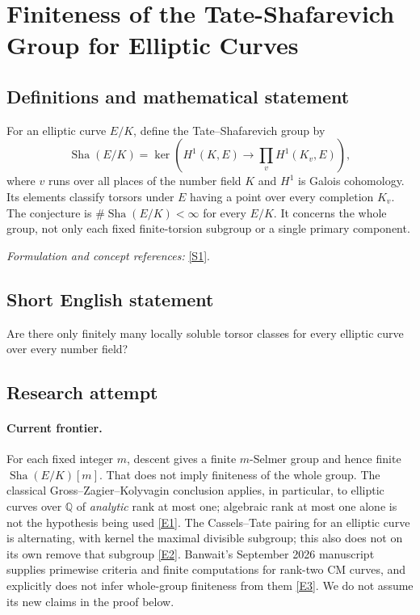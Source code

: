 \documentclass[11pt,a4paper]{article}
\newcommand{\Q}{\mathbb{Q}}
\newcommand{\sref}[2]{\hyperlink{source:#1:#2}{[S#2]}}
\newcommand{\eref}[2]{\hyperlink{extra:#1:#2}{[E#2]}}
\newif\ifshowcatalogue
\newcommand{\cataloguescope}[1]{\ifshowcatalogue
 \paragraph{Exact scope in the supplied catalogue.}
 \begin{quote}\small #1\end{quote}\fi}
\numberwithin{equation}{section}
\begin{document}
\setcounter{section}{58}
\clearpage
\section{\texorpdfstring{Finiteness of the Tate-Shafarevich Group for Elliptic Curves}{Finiteness of the Tate-Shafarevich Group for Elliptic Curves}}\label{59}
\subsection{Definitions and mathematical statement}
For an elliptic curve $E/K$, define the Tate--Shafarevich group by
\[
 \operatorname{Sha}(E/K)=\ker\!\left(H^1(K,E)\longrightarrow\prod_v H^1(K_v,E)\right),
\]
where $v$ runs over all places of the number field $K$ and $H^1$ is Galois cohomology. Its elements classify torsors under $E$ having a point over every completion $K_v$. The conjecture is $\#\operatorname{Sha}(E/K)<\infty$ for every $E/K$. It concerns the whole group, not only each fixed finite-torsion subgroup or a single primary component.
\par\smallskip\textit{Formulation and concept references:} \sref{59}{1}.
\cataloguescope{Prove that the Tate-Shafarevich group Sha(E/K) is finite for every elliptic curve E defined over a number field K.}
\subsection{Short English statement}
Are there only finitely many locally soluble torsor classes for every elliptic curve over every number field?
\subsection{Research attempt}

\paragraph{Current frontier.}
For each fixed integer $m$, descent gives a finite $m$-Selmer group and hence finite $\operatorname{Sha}(E/K)[m]$. That does not imply finiteness of the whole group. The classical Gross--Zagier--Kolyvagin conclusion applies, in particular, to elliptic curves over $\Q$ of \emph{analytic} rank at most one; algebraic rank at most one alone is not the hypothesis being used \eref{59}{1}. The Cassels--Tate pairing for an elliptic curve is alternating, with kernel the maximal divisible subgroup; this also does not on its own remove that subgroup \eref{59}{2}. Banwait's September 2026 manuscript supplies primewise criteria and finite computations for rank-two CM curves, and explicitly does not infer whole-group finiteness from them \eref{59}{3}. We do not assume its new claims in the proof below.
\end{document}
